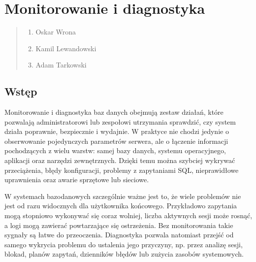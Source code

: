 \documentclass[a4paper,11pt,english,openany,oneside]{sphinxmanual}
\begin{document}
\section{Monitorowanie i diagnostyka}
\label{\detokenize{rozdzial_2/rozdzial_24/index:monitorowanie-i-diagnostyka}}\label{\detokenize{rozdzial_2/rozdzial_24/index::doc}}\begin{quote}\begin{description}
\begin{enumerate}
%
\item {} 
\sphinxAtStartPar
Oskar Wrona

\item {} 
\sphinxAtStartPar
Kamil Lewandowski

\item {} 
\sphinxAtStartPar
Adam Tarkowski

\end{enumerate}

\end{description}\end{quote}


\subsection{Wstęp}
\label{\detokenize{rozdzial_2/rozdzial_24/index:wstep}}
\sphinxAtStartPar
Monitorowanie i diagnostyka baz danych obejmują zestaw działań, które pozwalają administratorowi lub zespołowi utrzymania sprawdzić, czy system działa poprawnie, bezpiecznie i wydajnie. W praktyce nie chodzi jedynie o obserwowanie pojedynczych parametrów serwera, ale o łączenie informacji pochodzących z wielu warstw: samej bazy danych, systemu operacyjnego, aplikacji oraz narzędzi zewnętrznych. Dzięki temu można szybciej wykrywać przeciążenia, błędy konfiguracji, problemy z zapytaniami SQL, nieprawidłowe uprawnienia oraz awarie sprzętowe lub sieciowe.

\sphinxAtStartPar
W systemach bazodanowych szczególnie ważne jest to, że wiele problemów nie jest od razu widocznych dla użytkownika końcowego. Przykładowo zapytania mogą stopniowo wykonywać się coraz wolniej, liczba aktywnych sesji może rosnąć, a logi mogą zawierać powtarzające się ostrzeżenia. Bez monitorowania takie sygnały są łatwe do przeoczenia. Diagnostyka pozwala natomiast przejść od samego wykrycia problemu do ustalenia jego przyczyny, np. przez analizę sesji, blokad, planów zapytań, dzienników błędów lub zużycia zasobów systemowych.
\end{document}
